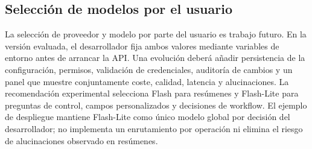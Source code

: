 \subsection{Selección de modelos por el usuario}

La selección de proveedor y modelo por parte del usuario es trabajo futuro. En
la versión evaluada, el desarrollador fija ambos valores mediante variables de
entorno antes de arrancar la API. Una evolución deberá añadir persistencia de
la configuración, permisos, validación de credenciales, auditoría de cambios y
un panel que muestre conjuntamente coste, calidad, latencia y alucinaciones. La
recomendación experimental selecciona Flash para resúmenes y Flash-Lite para
preguntas de control, campos personalizados y decisiones de workflow. El
ejemplo de despliegue mantiene Flash-Lite como único modelo global por decisión
del desarrollador; no implementa un enrutamiento por operación ni elimina el
riesgo de alucinaciones observado en resúmenes.

